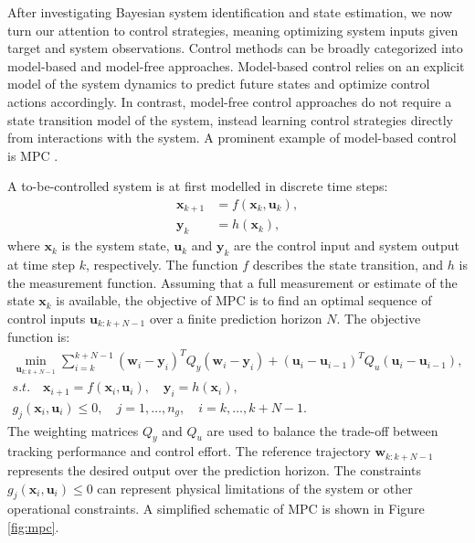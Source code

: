 After investigating Bayesian system identification and state estimation, we now turn our attention to control strategies, meaning optimizing system inputs given target and system observations. Control methods can be broadly categorized into model-based and model-free approaches. Model-based control relies on an explicit model of the system dynamics to predict future states and optimize control actions accordingly. In contrast, model-free control approaches do not require a state transition model of the system, instead learning control strategies directly from interactions with the system. A prominent example of model-based control is \acf{MPC} \citep{mpcreview1989, mpcbook2020}. 

A to-be-controlled system is at first modelled in discrete time steps:
\begin{subequations}
\begin{align}
    \label{eq:mpc_model}
    \boldsymbol{x}_{k+1} &= f(\boldsymbol{x}_k, \boldsymbol{u}_k), \\
    \boldsymbol{y}_k &= h(\boldsymbol{x}_k),
\end{align}
\end{subequations}
where $\boldsymbol{x}_k$ is the system state, $\boldsymbol{u}_k$ and $\boldsymbol{y}_k$ are the control input and system output at time step $k$, respectively. The function $f$ describes the state transition, and $h$ is the measurement function. Assuming that a full measurement or estimate of the state $\boldsymbol{x}_k$ is available, the objective of \ac{MPC} is to find an optimal sequence of control inputs $\boldsymbol{u}_{k:k+N-1}$ over a finite prediction horizon $N$. The objective function is:
\begin{subequations}
    \label{eq:mpc}
    \begin{gather}
        \min_{\boldsymbol{u}_{k:k+N-1}} \sum_{i=k}^{k+N-1}(\boldsymbol{w}_{i}-\boldsymbol{y}_{i})^TQ_y(\boldsymbol{w}_i-\boldsymbol{y}_{i})+(\boldsymbol{u}_i-\boldsymbol{u}_{i-1})^TQ_u(\boldsymbol{u}_i-\boldsymbol{u}_{i-1}),\\
        s.t. \quad    \boldsymbol{x}_{i+1} = f(\boldsymbol{x}_i, \boldsymbol{u}_i), \quad \boldsymbol{y}_i = h(\boldsymbol{x}_i),\\
        g_j(\boldsymbol{x}_i, \boldsymbol{u}_i)\leq 0, \quad j=1,\ldots,n_g, \quad i=k,\ldots,k+N-1.
    \end{gather}
\end{subequations}
The weighting matrices $Q_y$ and $Q_u$ are used to balance the trade-off between tracking performance and control effort. The reference trajectory $\boldsymbol{w}_{k:k+N-1}$ represents the desired output over the prediction horizon. The constraints $g_j(\boldsymbol{x}_i, \boldsymbol{u}_i)\leq 0$ can represent physical limitations of the system or other operational constraints. A simplified schematic of \ac{MPC} is shown in Figure \ref{fig:mpc}. 

